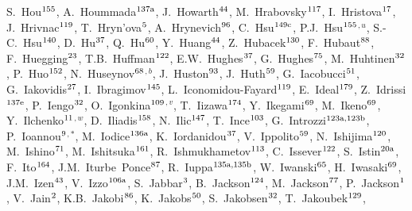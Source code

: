 \begin{flushleft}
S.~Hou$^\textrm{\scriptsize 155}$,
A.~Hoummada$^\textrm{\scriptsize 137a}$,
J.~Howarth$^\textrm{\scriptsize 44}$,
M.~Hrabovsky$^\textrm{\scriptsize 117}$,
I.~Hristova$^\textrm{\scriptsize 17}$,
J.~Hrivnac$^\textrm{\scriptsize 119}$,
T.~Hryn'ova$^\textrm{\scriptsize 5}$,
A.~Hrynevich$^\textrm{\scriptsize 96}$,
C.~Hsu$^\textrm{\scriptsize 149c}$,
P.J.~Hsu$^\textrm{\scriptsize 155}$$^{,u}$,
S.-C.~Hsu$^\textrm{\scriptsize 140}$,
D.~Hu$^\textrm{\scriptsize 37}$,
Q.~Hu$^\textrm{\scriptsize 60}$,
Y.~Huang$^\textrm{\scriptsize 44}$,
Z.~Hubacek$^\textrm{\scriptsize 130}$,
F.~Hubaut$^\textrm{\scriptsize 88}$,
F.~Huegging$^\textrm{\scriptsize 23}$,
T.B.~Huffman$^\textrm{\scriptsize 122}$,
E.W.~Hughes$^\textrm{\scriptsize 37}$,
G.~Hughes$^\textrm{\scriptsize 75}$,
M.~Huhtinen$^\textrm{\scriptsize 32}$,
P.~Huo$^\textrm{\scriptsize 152}$,
N.~Huseynov$^\textrm{\scriptsize 68}$$^{,b}$,
J.~Huston$^\textrm{\scriptsize 93}$,
J.~Huth$^\textrm{\scriptsize 59}$,
G.~Iacobucci$^\textrm{\scriptsize 51}$,
G.~Iakovidis$^\textrm{\scriptsize 27}$,
I.~Ibragimov$^\textrm{\scriptsize 145}$,
L.~Iconomidou-Fayard$^\textrm{\scriptsize 119}$,
E.~Ideal$^\textrm{\scriptsize 179}$,
Z.~Idrissi$^\textrm{\scriptsize 137e}$,
P.~Iengo$^\textrm{\scriptsize 32}$,
O.~Igonkina$^\textrm{\scriptsize 109}$$^{,v}$,
T.~Iizawa$^\textrm{\scriptsize 174}$,
Y.~Ikegami$^\textrm{\scriptsize 69}$,
M.~Ikeno$^\textrm{\scriptsize 69}$,
Y.~Ilchenko$^\textrm{\scriptsize 11}$$^{,w}$,
D.~Iliadis$^\textrm{\scriptsize 158}$,
N.~Ilic$^\textrm{\scriptsize 147}$,
T.~Ince$^\textrm{\scriptsize 103}$,
G.~Introzzi$^\textrm{\scriptsize 123a,123b}$,
P.~Ioannou$^\textrm{\scriptsize 9}$$^{,*}$,
M.~Iodice$^\textrm{\scriptsize 136a}$,
K.~Iordanidou$^\textrm{\scriptsize 37}$,
V.~Ippolito$^\textrm{\scriptsize 59}$,
N.~Ishijima$^\textrm{\scriptsize 120}$,
M.~Ishino$^\textrm{\scriptsize 71}$,
M.~Ishitsuka$^\textrm{\scriptsize 161}$,
R.~Ishmukhametov$^\textrm{\scriptsize 113}$,
C.~Issever$^\textrm{\scriptsize 122}$,
S.~Istin$^\textrm{\scriptsize 20a}$,
F.~Ito$^\textrm{\scriptsize 164}$,
J.M.~Iturbe~Ponce$^\textrm{\scriptsize 87}$,
R.~Iuppa$^\textrm{\scriptsize 135a,135b}$,
W.~Iwanski$^\textrm{\scriptsize 65}$,
H.~Iwasaki$^\textrm{\scriptsize 69}$,
J.M.~Izen$^\textrm{\scriptsize 43}$,
V.~Izzo$^\textrm{\scriptsize 106a}$,
S.~Jabbar$^\textrm{\scriptsize 3}$,
B.~Jackson$^\textrm{\scriptsize 124}$,
M.~Jackson$^\textrm{\scriptsize 77}$,
P.~Jackson$^\textrm{\scriptsize 1}$,
V.~Jain$^\textrm{\scriptsize 2}$,
K.B.~Jakobi$^\textrm{\scriptsize 86}$,
K.~Jakobs$^\textrm{\scriptsize 50}$,
S.~Jakobsen$^\textrm{\scriptsize 32}$,
T.~Jakoubek$^\textrm{\scriptsize 129}$,
$$
\end{flushleft}
